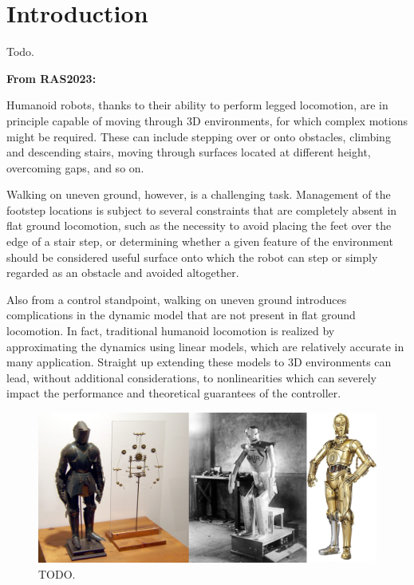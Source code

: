 \chapter{Introduction}
Todo.

\textbf{From RAS2023:}

Humanoid robots, thanks to their ability to perform legged locomotion,
are in principle capable of moving through 3D environments, for which complex
motions might be required. These can include stepping over or onto obstacles,
climbing and descending stairs, moving through surfaces located at different
height, overcoming gaps, and so on.

Walking on uneven ground, however, is a challenging task. Management of the
footstep locations is subject to several constraints that are completely absent
in flat ground locomotion, such as the necessity to avoid placing the feet over
the edge of a stair step, or determining whether a given feature of the
environment should be considered useful surface onto which the robot can
step or simply regarded as an obstacle and avoided altogether.

Also from a control standpoint, walking on uneven ground introduces
complications in the dynamic model that are not present in flat ground
locomotion. In fact, traditional humanoid locomotion is realized by
approximating the dynamics using linear models, which are relatively accurate
in many application. Straight up extending these models to 3D environments can
lead, without additional considerations, to nonlinearities which can severely
impact the performance and theoretical guarantees of the controller.

\begin{figure}
    \centering
    \includegraphics[width=\textwidth]{figures/01-introduction/robot-history.jpg}
    \caption{TODO.}
    \label{fig:introduction:robots-in-history}
\end{figure}

